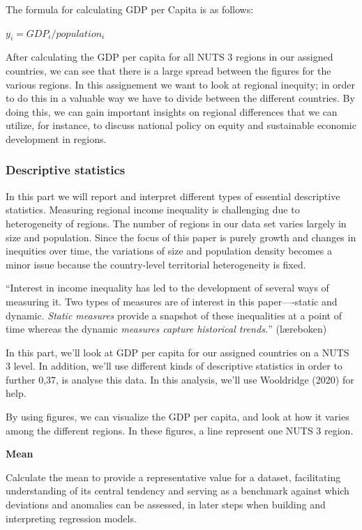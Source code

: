 \documentclass[
  a4paper,
  DIV=11,
  numbers=noendperiod]{scrartcl}
\begin{document}
The formula for calculating GDP per Capita is as follows:

\(y_i=GDP_i/population_i\)

After calculating the GDP per capita for all NUTS 3 regions in our
assigned countries, we can see that there is a large spread between the
figures for the various regions. In this assignement we want to look at
regional inequity; in order to do this in a valuable way we have to
divide between the different countries. By doing this, we can gain
important insights on regional differences that we can utilize, for
instance, to discuss national policy on equity and sustainable economic
development in regions.

\hypertarget{descriptive-statistics}{%
\subsubsection{Descriptive statistics}\label{descriptive-statistics}}

In this part we will report and interpret different types of essential
descriptive statistics. Measuring regional income inequality is
challenging due to heterogeneity of regions. The number of regions in
our data set varies largely in size and population. Since the focus of
this paper is purely growth and changes in inequities over time, the
variations of size and population density becomes a minor issue because
the country-level territorial heterogeneity is fixed.

``Interest in income inequality has led to the development of several
ways of measuring it. Two types of measures are of interest in this
paper----static and dynamic. \emph{Static measures} provide a snapshot
of these inequalities at a point of time whereas the dynamic
\emph{measures capture historical trends.}'' (læreboken)

In this part, we'll look at GDP per capita for our assigned countries on
a NUTS 3 level. In addition, we'll use different kinds of descriptive
statistics in order to further 0,37, is analyse this data. In this
analysis, we'll use Wooldridge (2020) for help.

By using figures, we can visualize the GDP per capita, and look at how
it varies among the different regions. In these figures, a line
represent one NUTS 3 region.

\textbf{Mean}

Calculate the mean to provide a representative value for a dataset,
facilitating understanding of its central tendency and serving as a
benchmark against which deviations and anomalies can be assessed, in
later steps when building and interpreting regression models.
\end{document}
